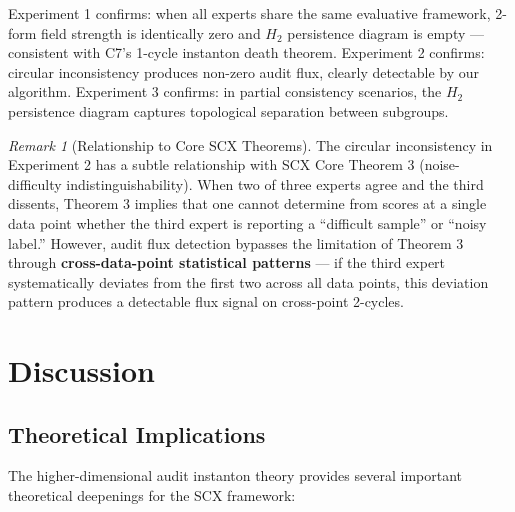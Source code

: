 \documentclass[12pt,a4paper]{article}
\theoremstyle{plain}
\theoremstyle{definition}
\theoremstyle{remark}
\newtheorem{remark}[theorem]{Remark}
\begin{document}
Experiment 1 confirms: when all experts share the same evaluative framework, 2-form field strength is identically zero and $H_2$ persistence diagram is empty --- consistent with C7's 1-cycle instanton death theorem. Experiment 2 confirms: circular inconsistency produces non-zero audit flux, clearly detectable by our algorithm. Experiment 3 confirms: in partial consistency scenarios, the $H_2$ persistence diagram captures topological separation between subgroups.

\begin{remark}[Relationship to Core SCX Theorems]
The circular inconsistency in Experiment 2 has a subtle relationship with SCX Core Theorem 3 (noise-difficulty indistinguishability). When two of three experts agree and the third dissents, Theorem 3 implies that one cannot determine from scores at a single data point whether the third expert is reporting a ``difficult sample'' or ``noisy label.'' However, audit flux detection bypasses the limitation of Theorem 3 through \textbf{cross-data-point statistical patterns} --- if the third expert systematically deviates from the first two across all data points, this deviation pattern produces a detectable flux signal on cross-point 2-cycles.
\end{remark}

\section{Discussion}
\label{sec:discussion}

\subsection{Theoretical Implications}
\label{sec:theory_implications}

The higher-dimensional audit instanton theory provides several important theoretical deepenings for the SCX framework:
\end{document}
